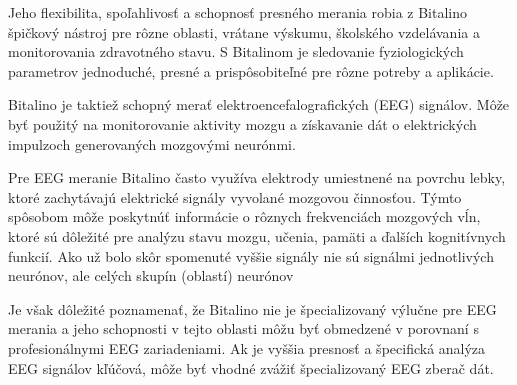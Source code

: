 \tab[5 mm] Jeho flexibilita, spoľahlivosť a schopnosť presného merania robia z Bitalino špičkový nástroj pre rôzne oblasti, vrátane výskumu, školského vzdelávania a monitorovania zdravotného stavu. S Bitalinom je sledovanie fyziologických parametrov jednoduché, presné a prispôsobiteľné pre rôzne potreby a aplikácie.

\tab[5 mm] Bitalino je taktiež schopný merať elektroencefalografických (EEG) signálov. Môže byť použitý na monitorovanie aktivity mozgu a získavanie dát o elektrických impulzoch generovaných mozgovými neurónmi.

Pre EEG meranie Bitalino často využíva elektrody umiestnené na povrchu lebky, ktoré zachytávajú elektrické signály vyvolané mozgovou činnosťou. Týmto spôsobom môže poskytnúť informácie o rôznych frekvenciách mozgových vĺn, ktoré sú dôležité pre analýzu stavu mozgu, učenia, pamäti a ďalších kognitívnych funkcií. Ako už bolo skôr spomenuté vyššie signály nie sú signálmi jednotlivých neurónov, ale celých skupín (oblastí) neurónov 

Je však dôležité poznamenať, že Bitalino nie je špecializovaný výlučne pre EEG merania a jeho schopnosti v tejto oblasti môžu byť obmedzené v porovnaní s profesionálnymi EEG zariadeniami. Ak je vyššia presnosť a špecifická analýza EEG signálov kľúčová, môže byť vhodné zvážiť špecializovaný EEG zberač dát.
